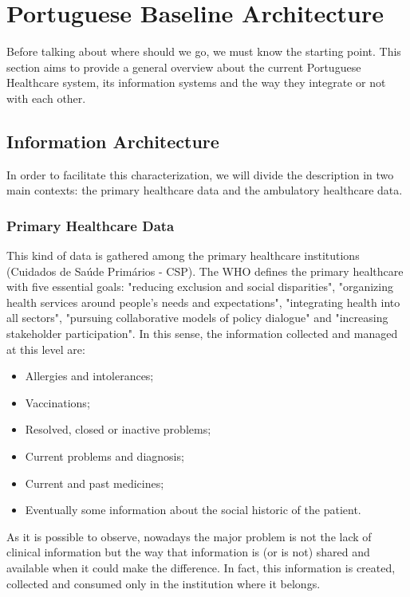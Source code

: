 \section{Portuguese Baseline Architecture}
Before talking about where should we go, we must know the starting point. This section aims to provide a general overview about the current Portuguese Healthcare system, its information systems and the way they integrate or not with each other.

\subsection{Information Architecture}

In order to facilitate this characterization, we will divide the description in two main contexts: the primary healthcare data and the ambulatory healthcare data.

\subsubsection{Primary Healthcare Data}

This kind of data is gathered among the primary healthcare institutions (Cuidados de Saúde Primários - CSP). The WHO defines the primary healthcare with five essential goals: "reducing exclusion and social disparities", "organizing health services around people's needs and expectations", "integrating health into all sectors", "pursuing collaborative models of policy dialogue" and "increasing stakeholder participation". In this sense, the information collected and managed at this level are:
\begin{itemize}
\item Allergies and intolerances;
\item Vaccinations;
\item Resolved, closed or inactive problems;
\item Current problems and diagnosis;
\item Current and past medicines;
\item Eventually some information about the social historic of the patient.
\end{itemize}

As it is possible to observe, nowadays the major problem is not the lack of clinical information but the way that information is (or is not) shared and available when it could make the difference. In fact, this information is created, collected and consumed only in the institution where it belongs.


